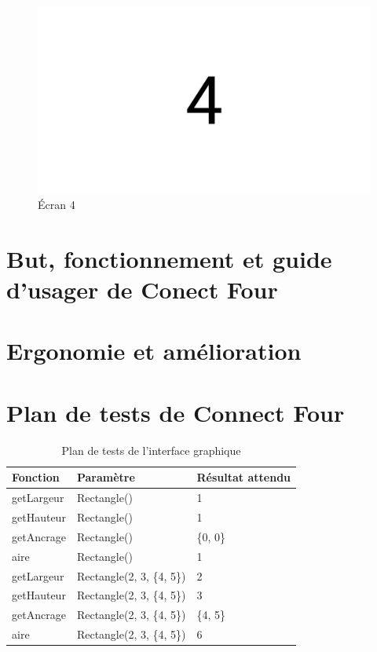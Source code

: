 \begin{figure}[H]
    \centering
    \includegraphics[width=6in]{img/4}
    \caption{Écran 4}
\end{figure}

\section{But, fonctionnement et guide d'usager de Conect Four}

\section{Ergonomie et amélioration}



\section{Plan de tests de Connect Four}

\begin{table}[H]
    \centering
    \caption{Plan de tests de l'interface graphique}
    \begin{tabular}{p{2in}p{2in}p{2in}}
        \hline
        \bfseries Fonction & \bfseries Paramètre & \bfseries Résultat attendu\\
        \hline
        getLargeur & Rectangle() & 1\\
        getHauteur & Rectangle() & 1\\
        getAncrage & Rectangle() & \{0, 0\}\\
        aire & Rectangle() & 1\\
        \hline
        getLargeur & Rectangle(2, 3, \{4, 5\}) & 2\\
        getHauteur & Rectangle(2, 3, \{4, 5\}) & 3\\
        getAncrage & Rectangle(2, 3, \{4, 5\}) & \{4, 5\}\\
        aire & Rectangle(2, 3, \{4, 5\}) & 6\\
        \hline
    \end{tabular}
\end{table}

